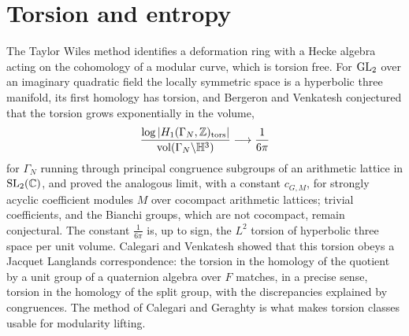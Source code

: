\section{Torsion and entropy}\label{sec:caltorsion}

The Taylor Wiles method identifies a deformation ring with a Hecke algebra acting on the cohomology of a modular curve, which is torsion free. For $\mathrm{GL}_2$ over an imaginary quadratic field the locally symmetric space is a hyperbolic three manifold, its first homology has torsion, and Bergeron and Venkatesh \cite{bergeronvenkatesh2013} conjectured that the torsion grows exponentially in the volume,
\begin{equation}\label{eq:calbv}
\frac{\log|H_1(\Gamma_N,\mathbb{Z})_{\mathrm{tors}}|}{\operatorname{vol}(\Gamma_N\backslash\mathbb H^3)}\longrightarrow\frac1{6\pi}
\end{equation}
for $\Gamma_N$ running through principal congruence subgroups of an arithmetic lattice in $\mathrm{SL}_2(\mathbb{C})$, and proved the analogous limit, with a constant $c_{G,M}$, for strongly acyclic coefficient modules $M$ over cocompact arithmetic lattices; trivial coefficients, and the Bianchi groups, which are not cocompact, remain conjectural. The constant $\frac1{6\pi}$ is, up to sign, the $L^2$ torsion of hyperbolic three space per unit volume. Calegari and Venkatesh \cite{calegarivenkatesh2019} showed that this torsion obeys a Jacquet Langlands correspondence: the torsion in the homology of the quotient by a unit group of a quaternion algebra over $F$ matches, in a precise sense, torsion in the homology of the split group, with the discrepancies explained by congruences. The method of Calegari and Geraghty is what makes torsion classes usable for modularity lifting.

